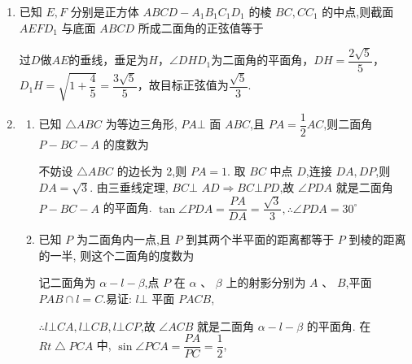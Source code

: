 \begin{enumerate}
    \item 已知 $E,F$ 分别是正方体 ${ABCD} - {A}_{1}{B}_{1}{C}_{1}{D}_{1}$ 的棱 ${BC},C{C}_{1}$ 的中点,则截面 ${AEF}{D}_{1}$ 与底面 ${ABCD}$ 所成二面角的正弦值等于
    \begin{jieda}
        过$D$做$AE$的垂线，垂足为$H$，$\angle{DHD_1}$为二面角的平面角，$DH = \dfrac{2\sqrt{5}}{5}$，$D_1H = \sqrt{1+\dfrac{4}{5}} = \dfrac{3\sqrt{5}}{5}$，故目标正弦值为$\dfrac{\sqrt{5}}{3}$.
    \end{jieda}

    \item \begin{enumerate}
        \item 已知 $\bigtriangleup {ABC}$ 为等边三角形, ${PA} \bot$ 面 ${ABC}$,且 ${PA} = \dfrac{1}{2}{AC}$,则二面角 $P - {BC} - A$ 的度数为
        \begin{jieda}
            不妨设 $\bigtriangleup {ABC}$ 的边长为 2,则 ${PA} = 1$. 取 ${BC}$ 中点 $D$,连接 ${DA},{DP}$,则 ${DA} = \sqrt{3}$. 由三垂线定理, ${BC} \bot$  ${AD} \Longrightarrow  {BC} \bot  {PD}$,故 $\angle {PDA}$ 就是二面角 $P - {BC} - A$ 的平面角. $\tan \angle {PDA} = \dfrac{PA}{DA} = \dfrac{\sqrt{3}}{3},\therefore \angle {PDA} = {30}^{ \circ  }$
        \end{jieda}
        \item 已知 $P$ 为二面角内一点,且 $P$ 到其两个半平面的距离都等于 $P$ 到棱的距离的一半, 则这个二面角的度数为
        \begin{jieda}
            记二面角为 $\alpha  - l - \beta$,点 $P$ 在 $\alpha$ 、 $\beta$ 上的射影分别为 $A$ 、 $B$,平面 ${PAB} \cap  l = C$.易证: $l \bot$ 平面 ${PACB}$,
            
            $\therefore l \bot  {CA},l \bot  {CB},l \bot  {CP}$,故 $\angle {ACB}$ 就是二面角 $\alpha  - l - \beta$ 的平面角. 在 ${{Rt}} \bigtriangleup  {PCA}$ 中, $\sin \angle {PCA} = \dfrac{PA}{PC} = \dfrac{1}{2}$,
            

\end{jieda}
\end{enumerate}
\end{enumerate}
